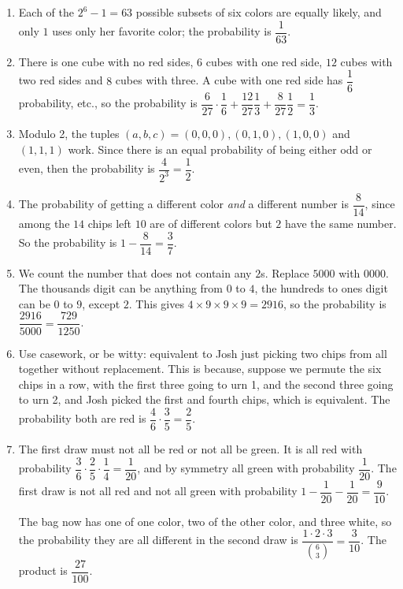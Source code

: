 \documentclass[10pt,paper=letter]{scrartcl}
\begin{document}
\begin{enumerate}

\item Each of the $2^6 - 1 = 63$ possible subsets of six colors are equally likely, and only $1$ uses only her favorite color; the probability is $\dfrac1{63}$.

\item There is one cube with no red sides, $6$ cubes with one red side, $12$ cubes with two red sides and $8$ cubes with three. A cube with one red side has $\dfrac16$ probability, etc., so the probability is $\dfrac{6}{27}\cdot\dfrac16 + \dfrac{12}{27}\dfrac13 + \dfrac{8}{27}\dfrac12 = \dfrac13$. 

\item Modulo 2, the tuples $(a, b, c) = (0, 0, 0), (0, 1, 0), (1, 0, 0)$ and $(1, 1, 1)$ work. Since there is an equal probability of being either odd or even, then the probability is $\dfrac{4}{2^3} = \dfrac12$.

\item The probability of getting a different color \emph{and} a different number is $\dfrac{8}{14}$, since among the $14$ chips left $10$ are of different colors but $2$ have the same number. So the probability is $1 - \dfrac{8}{14} = \dfrac37$.

\item We count the number that does not contain any $2$s. Replace $5000$ with $0000$. The thousands digit can be anything from $0$ to $4$, the hundreds to ones digit can be $0$ to $9$, except $2$. This gives $4 \times 9 \times 9 \times 9 = 2916$, so the probability is $\dfrac{2916}{5000} = \dfrac{729}{1250}$.

\item Use casework, or be witty: equivalent to Josh just picking two chips from all together without replacement. This is because, suppose we permute the six chips in a row, with the first three going to urn 1, and the second three going to urn 2, and Josh picked the first and fourth chips, which is equivalent. The probability both are red is $\dfrac46 \cdot \dfrac35 = \dfrac25$.

\item The first draw must not all be red or not all be green. It is all red with probability $\dfrac36\cdot\dfrac25\cdot\dfrac14 = \dfrac1{20}$, and by symmetry all green with probability $\dfrac1{20}$. The first draw is not all red and not all green with probability $1 - \dfrac1{20} - \dfrac1{20} = \dfrac9{10}$.

The bag now has one of one color, two of the other color, and three white, so the probability they are all different in the second draw is $\dfrac{1 \cdot 2 \cdot 3}{\binom63} = \dfrac3{10}$. The product is $\dfrac{27}{100}$.


\end{enumerate}
\end{document}
